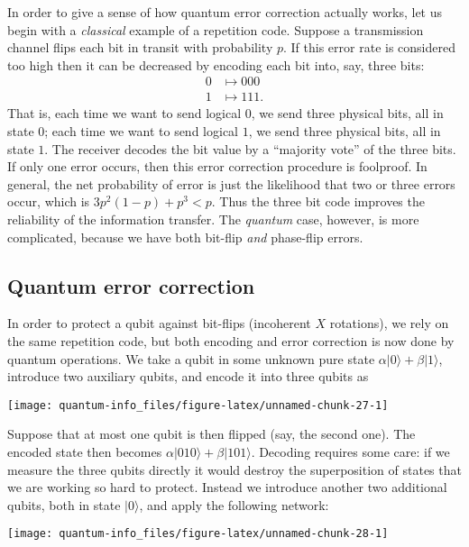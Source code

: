 \documentclass{article}
\begin{document}
In order to give a sense of how quantum error correction actually works, let us begin with a \emph{classical} example of a repetition code.
Suppose a transmission channel flips each bit in transit with probability \(p\).
If this error rate is considered too high then it can be decreased by encoding each bit into, say, three bits:
\[
  \begin{aligned}
    0 &\mapsto 000
  \\1 &\mapsto 111.
  \end{aligned}
\]
That is, each time we want to send logical \(0\), we send three physical bits, all in state \(0\); each time we want to send logical \(1\), we send three physical bits, all in state \(1\).
The receiver decodes the bit value by a ``majority vote'' of the three bits.
If only one error occurs, then this error correction procedure is foolproof.
In general, the net probability of error is just the likelihood that two or three errors occur, which is \(3p^2(1-p) + p^3 < p\).
Thus the three bit code improves the reliability of the information transfer.
The \emph{quantum} case, however, is more complicated, because we have both bit-flip \emph{and} phase-flip errors.

\hypertarget{quantum-error-correction}{%
\subsection{Quantum error correction}\label{quantum-error-correction}}

In order to protect a qubit against bit-flips (incoherent \(X\) rotations), we rely on the same repetition code, but both encoding and error correction is now done by quantum operations.
We take a qubit in some unknown pure state \(\alpha|0\rangle + \beta|1\rangle\), introduce two auxiliary qubits, and encode it into three qubits as

\begin{center}\texttt{[image: quantum-info\_files/figure-latex/unnamed-chunk-27-1]} \end{center}

Suppose that at most one qubit is then flipped (say, the second one).
The encoded state then becomes \(\alpha|010\rangle + \beta|101\rangle\).
Decoding requires some care: if we measure the three qubits directly it would destroy the superposition of states that we are working so hard to protect.
Instead we introduce another two additional qubits, both in state \(|0\rangle\), and apply the following network:

\begin{center}\texttt{[image: quantum-info\_files/figure-latex/unnamed-chunk-28-1]} \end{center}
\end{document}

